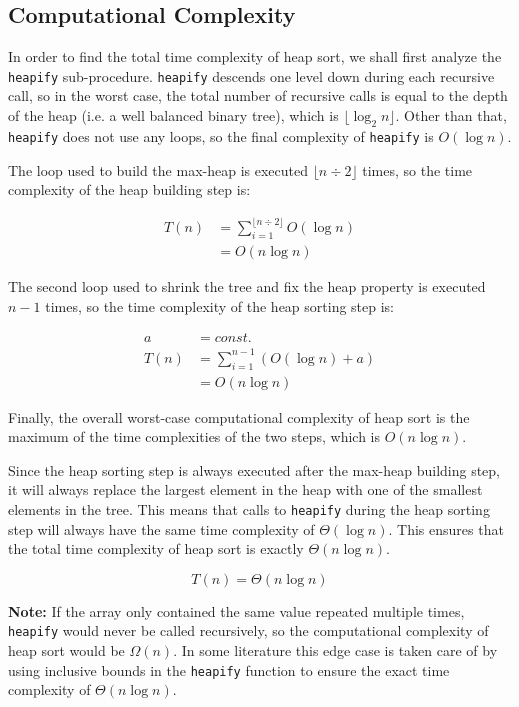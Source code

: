 \subsection{Computational Complexity}

In order to find the total time complexity of heap sort, we shall first analyze the \texttt{heapify} sub-procedure. \texttt{heapify} descends one level down during each recursive call, so in the worst case, the total number of recursive calls is equal to the depth of the heap (i.e. a well balanced binary tree), which is $\lfloor \log_2 n \rfloor$. Other than that, \texttt{heapify} does not use any loops, so the final complexity of \texttt{heapify} is $O(\log n)$.

The loop used to build the max-heap is executed $\lfloor n \div 2 \rfloor$ times, so the time complexity of the heap building step is:

\begin{equation*}
    \begin{aligned}
        T(n) &= \sum_{i=1}^{\lfloor n \div 2 \rfloor} O(\log n) \\
        &= O(n \log n)
    \end{aligned}
\end{equation*}

The second loop used to shrink the tree and fix the heap property is executed $n - 1$ times, so the time complexity of the heap sorting step is:

\begin{equation*}
    \begin{aligned}
        a &= const. \\
        T(n) &= \sum_{i=1}^{n - 1} (O(\log n) + a) \\
        &= O(n \log n)
    \end{aligned}
\end{equation*}

Finally, the overall worst-case computational complexity of heap sort is the maximum of the time complexities of the two steps, which is $O(n \log n)$.

Since the heap sorting step is always executed after the max-heap building step, it will always replace the largest element in the heap with one of the smallest elements in the tree. This means that calls to \texttt{heapify} during the heap sorting step will always have the same time complexity of $\Theta(\log n)$. This ensures that the total time complexity of heap sort is exactly $\Theta(n \log n)$.

\begin{equation*}
    T(n) = \Theta(n \log n)
\end{equation*}

\textbf{Note:} If the array only contained the same value repeated multiple times, \texttt{heapify} would never be called recursively, so the computational complexity of heap sort would be $\Omega(n)$. In some literature this edge case is taken care of by using inclusive bounds in the \texttt{heapify} function to ensure the exact time complexity of $\Theta(n \log n)$.
